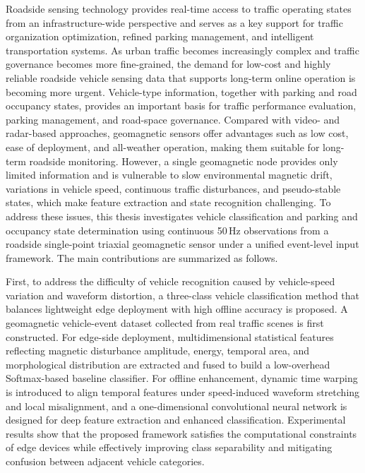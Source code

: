 
Roadside sensing technology provides real-time access to traffic operating states from an infrastructure-wide perspective and serves as a key support for traffic organization optimization, refined parking management, and intelligent transportation systems. As urban traffic becomes increasingly complex and traffic governance becomes more fine-grained, the demand for low-cost and highly reliable roadside vehicle sensing data that supports long-term online operation is becoming more urgent. Vehicle-type information, together with parking and road occupancy states, provides an important basis for traffic performance evaluation, parking management, and road-space governance. Compared with video- and radar-based approaches, geomagnetic sensors offer advantages such as low cost, ease of deployment, and all-weather operation, making them suitable for long-term roadside monitoring. However, a single geomagnetic node provides only limited information and is vulnerable to slow environmental magnetic drift, variations in vehicle speed, continuous traffic disturbances, and pseudo-stable states, which make feature extraction and state recognition challenging. To address these issues, this thesis investigates vehicle classification and parking and occupancy state determination using continuous 50\,Hz observations from a roadside single-point triaxial geomagnetic sensor under a unified event-level input framework. The main contributions are summarized as follows.

First, to address the difficulty of vehicle recognition caused by vehicle-speed variation and waveform distortion, a three-class vehicle classification method that balances lightweight edge deployment with high offline accuracy is proposed. A geomagnetic vehicle-event dataset collected from real traffic scenes is first constructed. For edge-side deployment, multidimensional statistical features reflecting magnetic disturbance amplitude, energy, temporal area, and morphological distribution are extracted and fused to build a low-overhead Softmax-based baseline classifier. For offline enhancement, dynamic time warping is introduced to align temporal features under speed-induced waveform stretching and local misalignment, and a one-dimensional convolutional neural network is designed for deep feature extraction and enhanced classification. Experimental results show that the proposed framework satisfies the computational constraints of edge devices while effectively improving class separability and mitigating confusion between adjacent vehicle categories.

